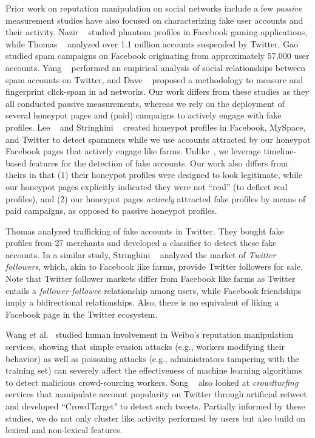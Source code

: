 \documentclass[twocolumn,10pt,letterpaper]{article}
\newcommand{\etal}{\frenchspacing{}{et al{.}}\xspace}
\begin{document}
Prior work on reputation manipulation on social networks include a few {\em passive} measurement studies have also focused on characterizing fake user accounts and their activity.
%
Nazir \etal~\cite{nazir10facebookphantomprofiles} studied phantom profiles in Facebook gaming applications, while
Thomas \etal~\cite{thomas11suspendedaccounts} analyzed over 1.1 million accounts suspended by Twitter.
%
Gao \etal~\cite{gao10socialspamcampaigns} studied spam campaigns on Facebook originating from approximately 57,000 user accounts.
%
Yang \etal~\cite{yang12spammersocialnetwork} performed an empirical analysis of social relationships between spam accounts on Twitter, and Dave \etal~\cite{dave2012measuring} proposed a methodology to measure and fingerprint click-spam in ad networks.
Our work differs from these studies as they all conducted passive measurements, whereas we rely on the deployment of several honeypot pages and (paid) campaigns to actively engage with fake profiles. Lee \etal~\cite{lee10socialspamhoneypots} and Stringhini \etal~\cite{stringhini10spammerssocialnetworks} created honeypot profiles in Facebook, MySpace, and Twitter to detect spammers while we use accounts attracted by our honeypot Facebook pages that actively engage like farms. Unlike~\cite{lee10socialspamhoneypots,stringhini10spammerssocialnetworks}, we
leverage timeline-based features for the detection of fake accounts. Our work also differs from theirs in that
(1) their honeypot profiles were designed to look legitimate, while our honeypot pages explicitly indicated they were not ``real'' (to deflect real profiles), and (2) our honeypot pages {\em actively} attracted fake profiles by means of paid campaigns, as opposed to passive honeypot profiles.

Thomas \etal \cite{thomas13traffickingfraudtwitteraccounts} analyzed trafficking of fake accounts in Twitter. They bought fake profiles from 27 merchants and developed a classifier to detect these fake accounts. In a similar study, Stringhini \etal~\cite{stringhini12twitterfollowermarketWOSN,stringhini13twitterfollower} analyzed the market of {\em Twitter followers}, which, akin to Facebook like farms, provide Twitter followers for sale.
Note that Twitter follower markets differ from Facebook like farms as Twitter entails a {\em follower-followee} relationship among users, while Facebook friendships imply a bidirectional relationships. Also, there is no equivalent of liking a Facebook page in the Twitter ecosystem.

Wang et al.~\cite{wang14adversarialdetection} studied human involvement in Weibo's reputation manipulation services,
showing that simple evasion attacks (e.g., workers modifying their behavior) as well as poisoning attacks (e.g., administrators tampering with the training set) can severely affect the effectiveness of machine learning algorithms to detect malicious crowd-sourcing workers. Song \etal~\cite{song2015crowdtarget} also looked at {\em crowdturfing} services that manipulate account popularity on Twitter through artificial retweet and developed ``CrowdTarget" to detect such tweets.
%
Partially informed by these studies, we do not only cluster like activity performed by users but also build on lexical and non-lexical features.
%
\end{document}
